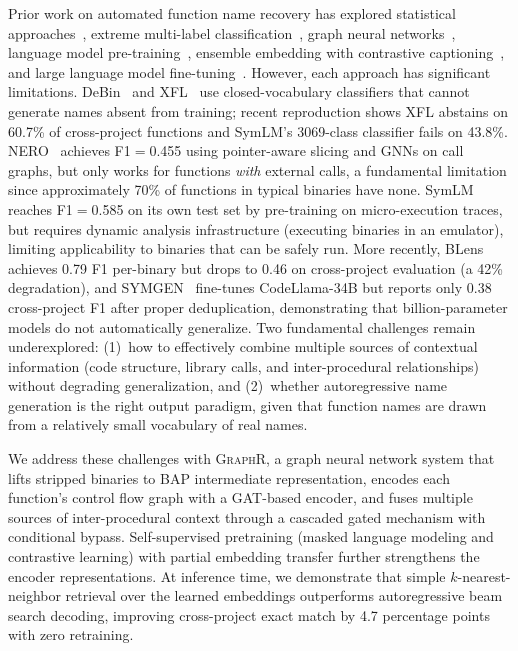 \documentclass[sigconf,nonacm]{acmart}
\newcommand{\sysname}{\textsc{GraphR}}
\begin{document}
Prior work on automated function name recovery has explored statistical approaches~\cite{debin}, extreme multi-label classification~\cite{xfl}, graph neural networks~\cite{nero}, language model pre-training~\cite{symlm}, ensemble embedding with contrastive captioning~\cite{blens}, and large language model fine-tuning~\cite{symgen,prorec}. However, each approach has significant limitations. DeBin~\cite{debin} and XFL~\cite{xfl} use closed-vocabulary classifiers that cannot generate names absent from training; recent reproduction shows XFL abstains on 60.7\% of cross-project functions and SymLM's 3069-class classifier fails on 43.8\%. NERO~\cite{nero} achieves F1$=$0.455 using pointer-aware slicing and GNNs on call graphs, but only works for functions \emph{with} external calls, a fundamental limitation since approximately 70\% of functions in typical binaries have none. SymLM~\cite{symlm} reaches F1$=$0.585 on its own test set by pre-training on micro-execution traces, but requires dynamic analysis infrastructure (executing binaries in an emulator), limiting applicability to binaries that can be safely run. More recently, BLens~\cite{blens} achieves 0.79 F1 per-binary but drops to 0.46 on cross-project evaluation (a 42\% degradation), and SYMGEN~\cite{symgen} fine-tunes CodeLlama-34B but reports only 0.38 cross-project F1 after proper deduplication, demonstrating that billion-parameter models do not automatically generalize. Two fundamental challenges remain underexplored: (1)~how to effectively combine multiple sources of contextual information (code structure, library calls, and inter-procedural relationships) without degrading generalization, and (2)~whether autoregressive name generation is the right output paradigm, given that function names are drawn from a relatively small vocabulary of real names.

We address these challenges with \sysname{}, a graph neural network system that lifts stripped binaries to BAP intermediate representation, encodes each function's control flow graph with a GAT-based encoder, and fuses multiple sources of inter-procedural context through a cascaded gated mechanism with conditional bypass. Self-supervised pretraining (masked language modeling and contrastive learning) with partial embedding transfer further strengthens the encoder representations. At inference time, we demonstrate that simple $k$-nearest-neighbor retrieval over the learned embeddings outperforms autoregressive beam search decoding, improving cross-project exact match by 4.7 percentage points with zero retraining.
\end{document}
